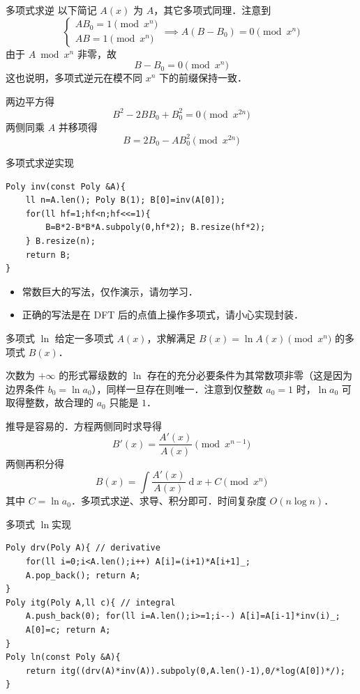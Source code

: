 \documentclass[fontset=fandol]{ctexbeamer}
\newcommand{\diff}{\operatorname{d}\!}
\begin{document}
\begin{frame}{多项式求逆}
以下简记 $A(x)$ 为 $A$，其它多项式同理．注意到
\[
\begin{cases}
A B_0 = 1 \pmod{x^n} \\
A B = 1 \pmod{x^n}
\end{cases} \implies A (B-B_0) = 0 \pmod{x^n}
\]
由于 $A \bmod{x^n}$ 非零，故
\[
B-B_0 = 0 \pmod{x^n}
\]
这也说明，多项式逆元在模不同 $x^n$ 下的前缀保持一致．

两边平方得
\[
B^2 - 2 B B_0 + B_0^2 = 0 \pmod{x^{2n}}
\]
两侧同乘 $A$ 并移项得
\[
B = 2 B_0 - A B_0^2 \pmod{x^{2n}}
\]
\end{frame}

\begin{frame}[fragile]{多项式求逆}{实现}
\begin{verbatim}
Poly inv(const Poly &A){
    ll n=A.len(); Poly B(1); B[0]=inv(A[0]);
    for(ll hf=1;hf<n;hf<<=1){
        B=B*2-B*B*A.subpoly(0,hf*2); B.resize(hf*2);
    } B.resize(n);
    return B;
}
\end{verbatim}

\begin{itemize}
    \item 常数巨大的写法，仅作演示，请勿学习．
    \item 正确的写法是在 DFT 后的点值上操作多项式，请小心实现封装．
\end{itemize}

\end{frame}

\begin{frame}{多项式 $\ln$}
给定一多项式 $A(x)$，求解满足 $B(x) = \ln A(x) \pmod{x^{n}}$ 的多项式 $B(x)$．

次数为 $+\infty$ 的形式幂级数的 $\ln$ 存在的充分必要条件为其常数项非零（这是因为边界条件 $b_0 = \ln a_0$），同样一旦存在则唯一．注意到仅整数 $a_0=1$ 时，$\ln a_0$ 可取得整数，故合理的 $a_0$ 只能是 $1$．

推导是容易的．方程两侧同时求导得
\[
B'(x) = \frac{A'(x)}{A(x)} \pmod{x^{n-1}}
\]
两侧再积分得
\[
B(x) = \int \frac{A'(x)}{A(x)} \diff x + C \pmod{x^{n}}
\]
其中 $C= \ln a_0$．多项式求逆、求导、积分即可．时间复杂度 $O(n \log n)$．

\end{frame}

\begin{frame}[fragile]{多项式 $\ln$}{实现}
{ \scriptsize
\begin{verbatim}
Poly drv(Poly A){ // derivative
    for(ll i=0;i<A.len();i++) A[i]=(i+1)*A[i+1]_;
    A.pop_back(); return A;
}
Poly itg(Poly A,ll c){ // integral
    A.push_back(0); for(ll i=A.len();i>=1;i--) A[i]=A[i-1]*inv(i)_;
    A[0]=c; return A;
}
Poly ln(const Poly &A){
    return itg((drv(A)*inv(A)).subpoly(0,A.len()-1),0/*log(A[0])*/);
}
\end{verbatim}
}
\end{frame}
\end{document}
